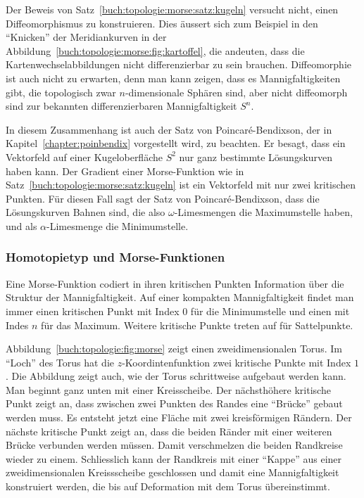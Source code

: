Der Beweis von Satz~\ref{buch:topologie:morse:satz:kugeln} versucht
nicht, einen Diffeomorphismus zu konstruieren.
Dies äussert sich zum Beispiel in den ``Knicken'' der Meridiankurven
in der Abbildung~\ref{buch:topologie:morse:fig:kartoffel}, die andeuten,
dass die Kartenwechselabbildungen nicht differenzierbar zu sein brauchen.
Diffeomorphie ist auch nicht zu erwarten, denn man kann zeigen, dass es
Mannigfaltigkeiten gibt, die topologisch zwar $n$-dimensionale
Sphären sind, aber nicht diffeomorph sind zur bekannten differenzierbaren
Mannigfaltigkeit $S^n$.

In diesem Zusammenhang ist auch der Satz von Poincaré-Bendixson,
der in Kapitel~\ref{chapter:poinbendix} vorgestellt wird, zu beachten.
Er besagt, dass ein Vektorfeld auf einer Kugeloberfläche $S^2$ nur
ganz bestimmte Lösungskurven haben kann.
Der Gradient einer Morse-Funktion wie in
Satz~\ref{buch:topologie:morse:satz:kugeln}
ist ein Vektorfeld mit nur zwei kritischen Punkten.
Für diesen Fall sagt der Satz von Poincaré-Bendixson, dass die
%
Lösungskurven Bahnen sind, die also $\omega$-Limesmengen die 
%
%
Maximumstelle haben, und als $\alpha$-Limesmenge die Minimumstelle.

%
%
\subsubsection{Homotopietyp und Morse-Funktionen}
Eine Morse-Funktion codiert in ihren kritischen Punkten Information
über die Struktur der Mannigfaltigkeit.
Auf einer kompakten Mannigfaltigkeit findet man immer einen kritischen
Punkt mit Index $0$ für die Minimumstelle und einen mit Indes $n$ für
das Maximum.
%
Weitere kritische Punkte treten auf für Sattelpunkte.

Abbildung~\ref{buch:topologie:fig:morse} zeigt einen zweidimensionalen
Torus.
Im ``Loch'' des Torus hat die $z$-Koordintenfunktion zwei kritische Punkte
mit Index $1$.
Die Abbildung zeigt auch, wie der Torus schrittweise aufgebaut werden
kann.
Man beginnt ganz unten mit einer Kreisscheibe.
Der nächsthöhere kritische Punkt zeigt an, dass zwischen zwei Punkten
des Randes eine ``Brücke'' gebaut werden muss.
Es entsteht jetzt eine Fläche mit zwei kreisförmigen Rändern.
Der nächste kritische Punkt zeigt an, dass die beiden Ränder mit
einer weiteren Brücke verbunden werden müssen.
Damit verschmelzen die beiden Randkreise wieder zu einem.
Schliesslich kann der Randkreis mit einer ``Kappe'' aus einer
zweidimensionalen Kreissscheibe geschlossen und damit eine
Mannigfaltigkeit konstruiert werden, die bis auf Deformation mit dem
Torus übereinstimmt.

